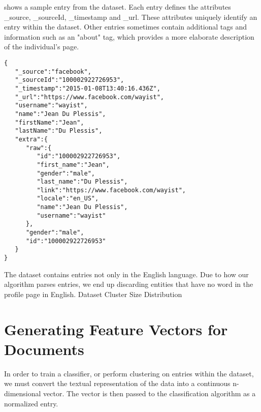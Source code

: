  shows a sample entry from the dataset.
Each entry defines the attributes \_source, \_sourceId, \_timestamp and \_url.
These attributes uniquely identify an entry within the dataset. Other entries
sometimes contain additional tags and information such as an "about" tag, which
provides a more elaborate description of the individual's page.

\lstset{language=java,caption=Dataset Entry,label=lst:dataset-entry}
\begin{lstlisting}
{
   "_source":"facebook",
   "_sourceId":"100002922726953",
   "_timestamp":"2015-01-08T13:40:16.436Z",
   "_url":"https://www.facebook.com/wayist",
   "username":"wayist",
   "name":"Jean Du Plessis",
   "firstName":"Jean",
   "lastName":"Du Plessis",
   "extra":{  
      "raw":{  
         "id":"100002922726953",
         "first_name":"Jean",
         "gender":"male",
         "last_name":"Du Plessis",
         "link":"https://www.facebook.com/wayist",
         "locale":"en_US",
         "name":"Jean Du Plessis",
         "username":"wayist"
      },
      "gender":"male",
      "id":"100002922726953"
   }
}
\end{lstlisting}

The dataset contains entries not only in the English language. Due to how
our algorithm parses entries, we end up discarding entities that have no word
in the profile page in English.
               {Dataset Cluster Size Distribution}

\section{Generating Feature Vectors for Documents}
\label{section:generating-features}
In order to train a classifier, or perform clustering on entries within the
dataset, we must convert the textual representation of the data into a continuous
n-dimensional vector. The vector is then passed to the classification algorithm
as a normalized entry.

